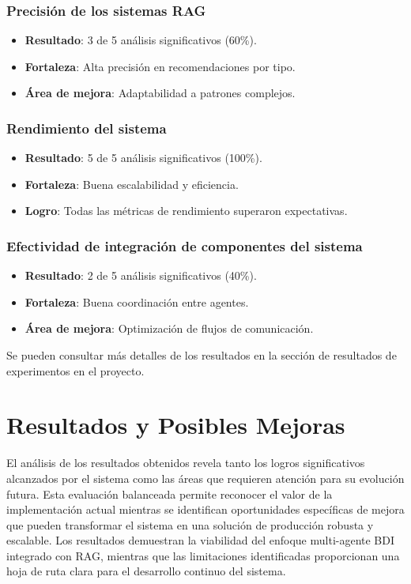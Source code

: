 \documentclass[runningheads,a4paper]{llncs}
\begin{document}
\subsubsection{Precisión de los sistemas RAG}
\begin{itemize}
    \item \textbf{Resultado}: 3 de 5 análisis significativos (60\%).
    \item \textbf{Fortaleza}: Alta precisión en recomendaciones por tipo.
    \item \textbf{Área de mejora}: Adaptabilidad a patrones complejos.
\end{itemize}

\subsubsection{Rendimiento del sistema}
\begin{itemize}
    \item \textbf{Resultado}: 5 de 5 análisis significativos (100\%).
    \item \textbf{Fortaleza}: Buena escalabilidad y eficiencia.
    \item \textbf{Logro}: Todas las métricas de rendimiento superaron expectativas.
\end{itemize}

\subsubsection{Efectividad de integración de componentes del sistema}
\begin{itemize}
    \item \textbf{Resultado}: 2 de 5 análisis significativos (40\%).
    \item \textbf{Fortaleza}: Buena coordinación entre agentes.
    \item \textbf{Área de mejora}: Optimización de flujos de comunicación.
\end{itemize}

Se pueden consultar más detalles de los resultados en la sección de resultados de experimentos en el proyecto.

\section{Resultados y Posibles Mejoras}

El análisis de los resultados obtenidos revela tanto los logros significativos alcanzados por el sistema como las áreas 
que requieren atención para su evolución futura. Esta evaluación balanceada permite reconocer el valor de la implementación 
actual mientras se identifican oportunidades específicas de mejora que pueden transformar el sistema en una solución de 
producción robusta y escalable. Los resultados demuestran la viabilidad del enfoque multi-agente BDI integrado con RAG, 
mientras que las limitaciones identificadas proporcionan una hoja de ruta clara para el desarrollo continuo del sistema.
\end{document}
